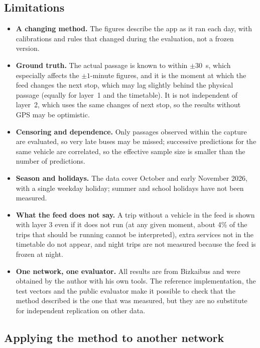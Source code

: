 \subsection{Limitations}
\label{sec:limitations}

\begin{itemize}
  \item \textbf{A changing method.} The figures describe the app as it ran each day, with calibrations and rules that
        changed during the evaluation, not a frozen version.
  \item \textbf{Ground truth.} The actual passage is known to within $\pm30$~s, which especially affects the
        $\pm1$-minute figures, and it is the moment at which the feed changes the next stop, which may lag slightly
        behind the physical passage (equally for layer~1 and the timetable). It is not independent of layer~2, which uses
        the same changes of next stop, so the results without GPS may be optimistic.
  \item \textbf{Censoring and dependence.} Only passages observed within the capture are evaluated, so very late buses
        may be missed; successive predictions for the same vehicle are correlated, so the effective sample size is
        smaller than the number of predictions.
  \item \textbf{Season and holidays.} The data cover October and early November 2026, with a single weekday holiday;
        summer and school holidays have not been measured.
  \item \textbf{What the feed does not say.} A trip without a vehicle in the feed is shown with layer 3 even if it does
        not run (at any given moment, about 4\% of the trips that should be running cannot be interpreted), extra services
        not in the timetable do not appear, and night trips are not measured because the feed is frozen at night.
  \item \textbf{One network, one evaluator.} All results are from Bizkaibus and were obtained by the author with his own
        tools. The reference implementation, the test vectors and the public evaluator make it possible to check that
        the method described is the one that was measured, but they are no substitute for independent replication on
        other data.
\end{itemize}

\subsection{Applying the method to another network}
\label{sec:other-networks}

